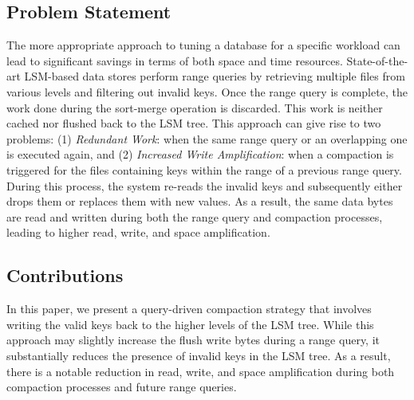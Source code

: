 \subsection{Problem Statement}
The more appropriate approach to tuning a database for a specific workload can lead to significant savings in terms of 
both space and time resources. State-of-the-art LSM-based data stores perform range queries by retrieving multiple files
from various levels and filtering out invalid keys. Once the range query is complete, the work done during the 
sort-merge operation is discarded. This work is neither cached nor flushed back to the LSM tree. This approach can give
rise to two problems: (1) \textit{Redundant Work}: when the same range query or an overlapping one is executed again, 
and (2) \textit{Increased Write Amplification}: when a compaction is triggered for the files containing keys 
within the range of a previous range query. During this process, the system re-reads the invalid keys and subsequently 
either drops them or replaces them with new values. As a result, the same data bytes are read and written during both 
the range query and compaction processes, leading to higher read, write, and space amplification.


\subsection{Contributions}
In this paper, we present a query-driven compaction strategy that involves writing the valid keys back to the higher 
levels of the LSM tree. While this approach may slightly increase the flush write bytes during a range query, it 
substantially reduces the presence of invalid keys in the LSM tree. As a result, there is a notable reduction in read, 
write, and space amplification during both compaction processes and future range queries.